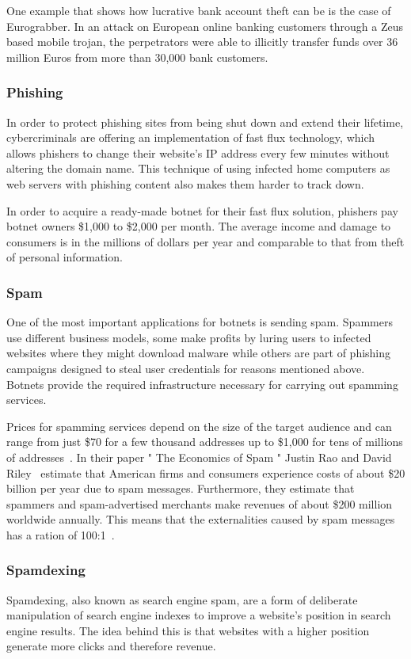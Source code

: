 One example that shows how lucrative bank account theft can be is the case of Eurograbber.
In an attack on European online banking customers through a Zeus based mobile trojan, the perpetrators were able to illicitly transfer funds over 36 million Euros from more than 30,000 bank customers.\cite{Kalige12}

\subsubsection{Phishing}
In order to protect phishing sites from being shut down and extend their lifetime, cybercriminals are offering an implementation of fast flux technology, which allows phishers to change their website's IP address every few minutes without altering the domain name.
This technique of using infected home computers as web servers with phishing content also makes them harder to track down.\cite{Namestnikov09}

In order to acquire a ready-made botnet for their fast flux solution, phishers pay botnet owners \$1,000 to \$2,000 per month.
The average income and damage to consumers is in the millions of dollars per year and comparable to that from theft of personal information.\cite{Namestnikov09}

\subsubsection{Spam}
One of the most important applications for botnets is sending spam.
Spammers use different business models, some make profits by luring users to infected websites where they might download malware while others are part of phishing campaigns designed to steal user credentials for reasons mentioned above.
Botnets provide the required infrastructure necessary for carrying out spamming services.\cite{Bailey09}

Prices for spamming services depend on the size of the target audience and can range from just \$70 for a few thousand addresses up to \$1,000 for tens of millions of addresses~\cite{Namestnikov09}.
In their paper " The Economics of Spam " Justin Rao and David Riley~\cite{Rao12} estimate that American firms and consumers experience costs of about \$20 billion per year due to spam messages.
Furthermore, they estimate that spammers and spam-advertised merchants make revenues of about \$200 million worldwide annually.
This means that the externalities caused by spam messages has a ration of 100:1~\cite{Rao12}.

\subsubsection{Spamdexing}
Spamdexing, also known as search engine spam, are a form of deliberate manipulation of search engine indexes to improve a website's position in search engine results.
The idea behind this is that websites with a higher position generate more clicks and therefore revenue.

